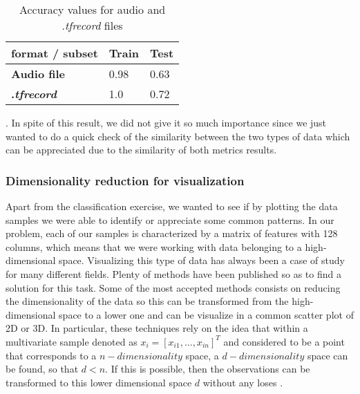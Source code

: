	\begin{table}[h]
	\begin{center}
		\centering
		\begin{tabular}{|| m{7em} | m{7em} | m{7em} ||}
			\hline
			format / subset & \textbf{Train} & \textbf{Test} \\
			\hline\hline
			\textbf{Audio file} & 0.98 & 0.63 \\
			\hline
			\textbf{.\textit{tfrecord}} & 1.0 & 0.72 \\
			\hline
		\end{tabular}
	\end{center}
	\caption{Accuracy values for audio and .\textit{tfrecord} files}
	\label{table:5}
	\end{table}

	. In spite of this result, we did not give it so much importance since we just wanted to do a quick check of the similarity between the two types of data which can be appreciated due to the similarity of both metrics results.
	
\subsubsection{Dimensionality reduction for visualization}
	
	Apart from the classification exercise, we wanted to see if by plotting the data samples we were able to identify or appreciate some common patterns. In our problem, each of our samples is characterized by a matrix of features with 128 columns, which means that we were working with data belonging to a high-dimensional space. Visualizing this type of data has always been a case of study for many different fields. Plenty of methods have been published so as to find a solution for this task. Some of the most accepted methods consists on reducing the dimensionality of the data so this can be transformed from the high-dimensional space to a lower one and can be visualize in a common scatter plot of 2D or 3D. In particular, these techniques rely on the idea that within a multivariate sample denoted as $x_i = [x_{i1},..., x_{in}]^T$ and considered to be a point that corresponds to a $n-dimensionality$ space, a $d-dimensionality$ space can be found, so that $d < n$. %
	If this is possible, then the observations can be transformed to this lower dimensional space $d$ without any loses \cite{Kaski2011}. 
	
